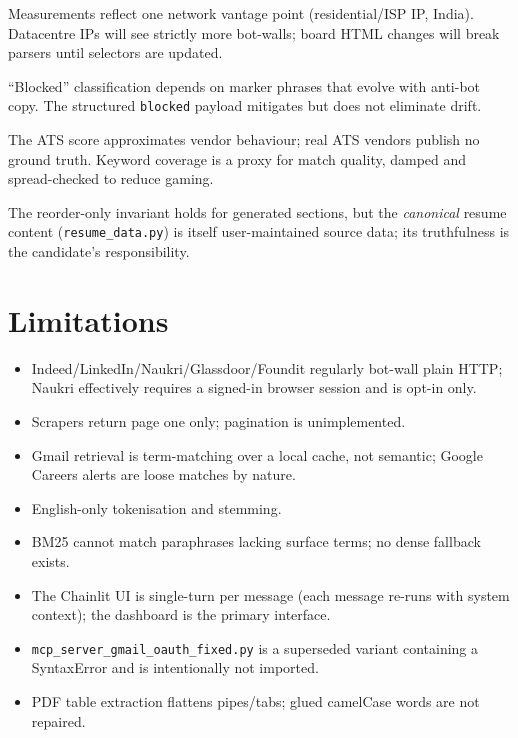\documentclass[11pt,a4paper]{article}
\newcommand{\file}[1]{\texttt{\small #1}}
\newcommand{\code}[1]{\texttt{#1}}
\begin{document}
\begin{description}[leftmargin=6.4em, style=nextline]
  \item[External validity] Measurements reflect one network vantage point
        (residential/ISP IP, India). Datacentre IPs will see strictly more
        bot-walls; board HTML changes will break parsers until selectors
        are updated.
  \item[Internal validity] ``Blocked'' classification depends on marker
        phrases that evolve with anti-bot copy. The structured
        \code{blocked} payload mitigates but does not eliminate drift.
  \item[Construct validity] The ATS score approximates vendor behaviour;
        real ATS vendors publish no ground truth. Keyword coverage is a
        proxy for match quality, damped and spread-checked to reduce
        gaming.
  \item[Content integrity] The reorder-only invariant holds for generated
        sections, but the \emph{canonical} resume content
        (\file{resume\_data.py}) is itself user-maintained source data; its
        truthfulness is the candidate's responsibility.
\end{description}

\section{Limitations}
\label{sec:limitations}

\begin{itemize}[leftmargin=2em]
  \item Indeed/LinkedIn/Naukri/Glassdoor/Foundit regularly bot-wall plain
        HTTP; Naukri effectively requires a signed-in browser session and
        is opt-in only.
  \item Scrapers return page one only; pagination is unimplemented.
  \item Gmail retrieval is term-matching over a local cache, not semantic;
        Google Careers alerts are loose matches by nature.
  \item English-only tokenisation and stemming.
  \item BM25 cannot match paraphrases lacking surface terms; no dense
        fallback exists.
  \item The Chainlit UI is single-turn per message (each message re-runs
        with system context); the dashboard is the primary interface.
  \item \file{mcp\_server\_gmail\_oauth\_fixed.py} is a superseded variant
        containing a SyntaxError and is intentionally not imported.
  \item PDF table extraction flattens pipes/tabs; glued camelCase words are
        not repaired.
\end{itemize}
\end{document}
